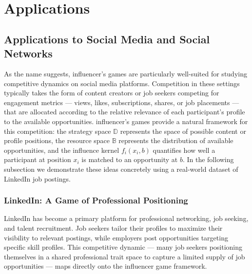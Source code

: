 \documentclass{article}
\begin{document}
    \section{Applications}\label{sec:SI_applications}

        \subsection{Applications to Social Media and Social Networks}\label{subsec:SI_social_media}

            As the name suggests, influencer's games are particularly well-suited for studying competitive dynamics on social media platforms.
            Competition in these settings typically takes the form of content creators or job seekers competing for engagement metrics --- views, likes, subscriptions, shares, or job placements --- that are allocated according to the relative relevance of each participant's profile to the available opportunities.
            influencer's games provide a natural framework for this competition: the strategy space $\mathbb{D}$ represents the space of possible content or profile positions, the resource space $\mathbb{B}$ represents the distribution of available opportunities, and the influence kernel $f_i(x_i, b)$ quantifies how well a participant at position $x_i$ is matched to an opportunity at $b$.
            In the following subsection we demonstrate these ideas concretely using a real-world dataset of LinkedIn job postings.

        \subsubsection{LinkedIn: A Game of Professional Positioning}\label{subsubsec:SI_linkedin}

            LinkedIn has become a primary platform for professional networking, job seeking, and talent recruitment.
            Job seekers tailor their profiles to maximize their visibility to relevant postings, while employers post opportunities targeting specific skill profiles.
            This competitive dynamic --- many job seekers positioning themselves in a shared professional trait space to capture a limited supply of job opportunities --- maps directly onto the influencer game framework.
\end{document}
